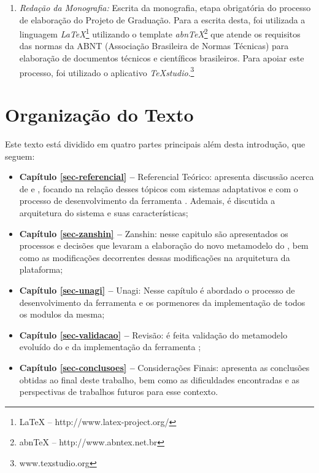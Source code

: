 \begin{enumerate}
	\item \textit{Redação da Monografia:} Escrita da monografia, etapa obrigatória do processo de elaboração do Projeto de Graduação. Para a escrita desta, foi utilizada a linguagem \textit{LaTeX}\footnote{LaTeX -- http://www.latex-project.org/} utilizando o template \textit{abnTeX}\footnote{abnTeX -- http://www.abntex.net.br} que atende os requisitos das normas da ABNT (Associação Brasileira de Normas Técnicas) para elaboração de documentos técnicos e científicos brasileiros. Para apoiar este processo, foi utilizado o aplicativo \textit{TeXstudio}.\footnote{www.texstudio.org}
	
\end{enumerate}


\section{Organização do Texto}
\label{sec-intro-organizacao}

Este texto está dividido em quatro partes principais além desta introdução, que seguem:

\begin{itemize}
	\item \textbf{Capítulo \ref{sec-referencial} --} Referencial Teórico: apresenta discussão acerca de \gore e \mdd, focando na relação desses tópicos com sistemas adaptativos e com o processo de desenvolvimento da ferramenta \unagi. Ademais, é discutida a arquitetura do sistema \zanshin e suas características;
	
	\item \textbf{Capítulo \ref{sec-zanshin} --} Zanshin: nesse capitulo são apresentados os processos e decisões que levaram a elaboração do novo metamodelo do \zanshin, bem como as modificações decorrentes dessas modificações na arquitetura da plataforma;
	
	\item \textbf{Capítulo \ref{sec-unagi} --} Unagi: Nesse capítulo é abordado o processo de desenvolvimento da ferramenta \unagi e os pormenores da implementação de todos os modulos da mesma;
	
	\item \textbf{Capítulo \ref{sec-validacao} --} Revisão: é feita validação do metamodelo evoluído do \zanshin e da implementação da ferramenta \unagi;
	
	\item \textbf{Capítulo \ref{sec-conclusoes} --} Considerações Finais: apresenta as conclusões obtidas ao final deste trabalho, bem como as dificuldades encontradas e as perspectivas de trabalhos futuros para esse contexto.
\end{itemize}









